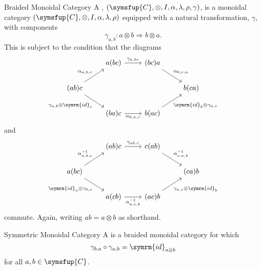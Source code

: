 \documentclass[fleqn]{NotesClass}
\newcommand{\cat}[1]{\symsfup{#1}}
\newcommand{\id}{\symrm{id}}
\newcommand{\natTrans}{\Rightarrow}
\begin{document}
    \begin{dfn}{Braided Monoidal Category}{}
        A , \((\cat{C}, \otimes, I, \alpha, \lambda, \rho, \gamma)\), is a monoidal category \((\cat{C}, \otimes, I, \alpha, \lambda, \rho)\) equipped with a natural transformation, \(\gamma\), with components
        \begin{equation}
            \gamma_{a,b} \colon a \otimes b \natTrans b \otimes a.
        \end{equation}
        This is subject to the condition that the diagrams
        \begin{equation}
            \begin{tikzcd}
                & a(bc) \arrow[r, "{\gamma_{a,bc}}"] & (bc)a \arrow[dr, "{\alpha_{b,c,a}}"]\\
                (ab)c \arrow[ur, "{\alpha_{a,b,c}}"] \arrow[dr, "{\gamma_{a,b} \otimes \id_c}"'] &&& b(ca)\\
                & (ba)c \arrow[r, "{\alpha_{b,a,c}}"'] & b(ac) \arrow[ur, "{\id_b \otimes \gamma_{a,c}}"']
            \end{tikzcd}
        \end{equation}
        and
        \begin{equation}
            \begin{tikzcd}
                & (ab)c \arrow[r, "{\gamma_{ab,c}}"] & c(ab) \arrow[dr, "{\alpha_{c,a,b}^{-1}}"]\\
                a(bc) \arrow[ur, "{\alpha_{a,b,c}^{-1}}"] \arrow[dr, "{\id_a \otimes \gamma_{b,c}}"'] &&& (ca)b\\
                & a(cb) \arrow[r, "{\alpha_{a,c,b}^{-1}}"'] & (ac)b \arrow[ur, "{\gamma_{a,c} \otimes \id_b}"']
            \end{tikzcd}
        \end{equation}
        commute.
        Again, writing \(ab = a \otimes b\) as shorthand.
    \end{dfn}
    
    \begin{dfn}{Symmetric Monoidal Category}{}
        A  is a braided monoidal category for which
        \begin{equation}
            \gamma_{b,a} \circ \gamma_{a,b} = \id_{a \otimes b}
        \end{equation}
        for all \(a, b \in \cat{C}\).
    \end{dfn}
    
\end{document}
